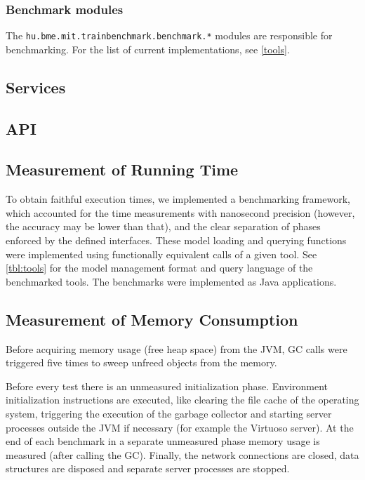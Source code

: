 \subsubsection{Benchmark modules}

The \texttt{hu.bme.mit.trainbenchmark.benchmark.*} modules are responsible for benchmarking. For the list of current implementations, see \autoref{tools}.


\subsection{Services}

\subsection{API}

\subsection{Measurement of Running Time}

To obtain faithful execution times, we implemented a benchmarking framework,
which accounted for the time measurements with nanosecond precision (however, the accuracy may be lower than that),
 and the clear separation of phases enforced by the defined
interfaces. These model loading and querying functions were implemented using
functionally equivalent calls of a given tool. See \autoref{tbl:tools} for
the model management format and query language of the benchmarked tools. The
benchmarks were implemented as Java applications.

\subsection{Measurement of Memory Consumption}
Before acquiring memory usage (free heap space) from the JVM, GC calls were triggered five times to sweep unfreed objects from the memory.

Before every test
there is an unmeasured initialization phase. Environment initialization
instructions are executed, like clearing the file cache of the operating system, triggering the
execution of the garbage collector and starting server processes outside the
JVM if necessary (for example the Virtuoso server). At the end of each benchmark
in a separate unmeasured phase memory usage is measured (after calling the GC).
Finally, the network connections are closed, data structures are disposed and
separate server processes are stopped.


